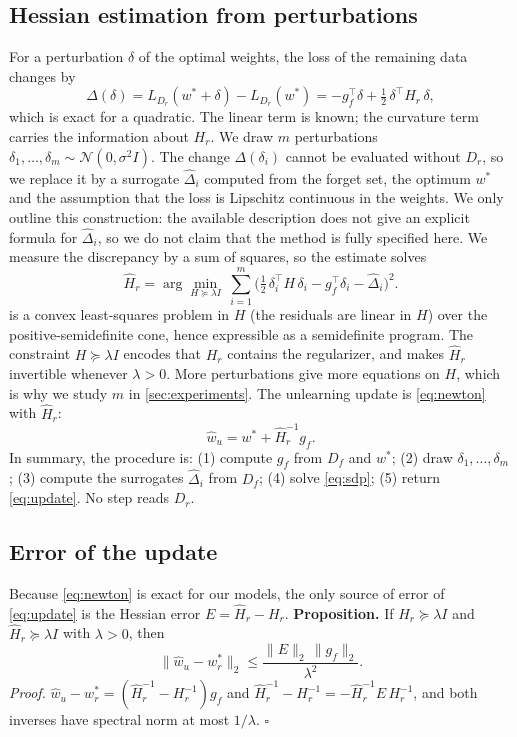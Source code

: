 \documentclass[10pt,twocolumn,letterpaper]{article}
\begin{document}
\subsection{Hessian estimation from perturbations}
\label{sec:hessian}
For a perturbation $\delta$ of the optimal weights, the loss of the remaining data changes by
\begin{equation}
  \Delta(\delta)=L_{D_r}(w^\ast+\delta)-L_{D_r}(w^\ast)=-g_f^\top\delta+\tfrac12\,\delta^\top H_r\,\delta ,
  \label{eq:taylor}
\end{equation}
which is exact for a quadratic.
The linear term is known; the curvature term carries the information about $H_r$.
We draw $m$ perturbations $\delta_1,\dots,\delta_m\sim\mathcal{N}(0,\sigma^2 I)$.
The change $\Delta(\delta_i)$ cannot be evaluated without $D_r$, so we replace it by a surrogate $\hat\Delta_i$ computed from the forget set, the optimum $w^\ast$ and the assumption that the loss is Lipschitz continuous in the weights. We only outline this construction: the available description does not give an explicit formula for $\hat\Delta_i$, so we do not claim that the method is fully specified here.
We measure the discrepancy by a sum of squares, so the estimate solves
\begin{equation}
  \hat H_r=\arg\min_{H\succeq\lambda I}\ \sum_{i=1}^{m}\Big(\tfrac12\,\delta_i^\top H\,\delta_i - g_f^\top\delta_i-\hat\Delta_i\Big)^2 .
  \label{eq:sdp}
\end{equation}
 is a convex least-squares problem in $H$ (the residuals are linear in $H$) over the positive-semidefinite cone, hence expressible as a semidefinite program.
The constraint $H\succeq\lambda I$ encodes that $H_r$ contains the regularizer, and makes $\hat H_r$ invertible whenever $\lambda>0$.
More perturbations give more equations on $H$, which is why we study $m$ in \cref{sec:experiments}.
The unlearning update is \cref{eq:newton} with $\hat H_r$:
\begin{equation}
  \hat w_u = w^\ast+\hat H_r^{-1}g_f .
  \label{eq:update}
\end{equation}
In summary, the procedure is: (1) compute $g_f$ from $D_f$ and $w^\ast$; (2) draw $\delta_1,\dots,\delta_m$; (3) compute the surrogates $\hat\Delta_i$ from $D_f$; (4) solve \cref{eq:sdp}; (5) return \cref{eq:update}. No step reads $D_r$.

\subsection{Error of the update}
\label{sec:theory}
Because \cref{eq:newton} is exact for our models, the only source of error of \cref{eq:update} is the Hessian error $E=\hat H_r-H_r$.
\textbf{Proposition.} If $H_r\succeq\lambda I$ and $\hat H_r\succeq\lambda I$ with $\lambda>0$, then
\begin{equation}
  \|\hat w_u-w_r^\ast\|_2\le\frac{\|E\|_2\,\|g_f\|_2}{\lambda^2}.
  \label{eq:bound}
\end{equation}
\emph{Proof.} $\hat w_u-w_r^\ast=(\hat H_r^{-1}-H_r^{-1})g_f$ and $\hat H_r^{-1}-H_r^{-1}=-\hat H_r^{-1}E\,H_r^{-1}$, and both inverses have spectral norm at most $1/\lambda$. $\square$
\end{document}
